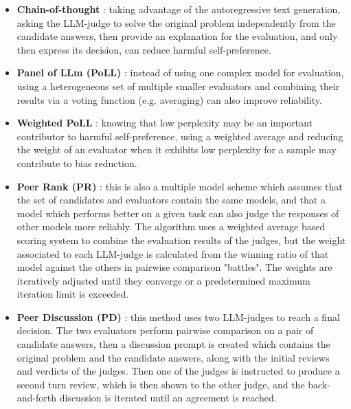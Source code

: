 \documentclass[noindent,nohyp,parspace,titlepage,twoside,12pt]{article}
\begin{document}
        \begin{itemize}
          \item \textbf{Chain-of-thought} \cite{arena,justice}: taking
                advantage of the autoregressive text generation, asking the
                LLM-judge to solve the original problem independently from the
                candidate answers, then provide an explanation for the
                evaluation, and only then express its decision, can reduce
                harmful self-preference.

          \item \textbf{Panel of LLm (PoLL)} \cite{juries}: instead of using
                one complex model for evaluation, using a heterogeneous set of
                multiple smaller evaluators and combining their results via a
                voting function (e.g. averaging) can also improve reliability.

          \item \textbf{Weighted PoLL} \cite{biasself}: knowing that low
                perplexity may be an important contributor to harmful
                self-preference, using a weighted average and reducing the
                weight of an evaluator when it exhibits low perplexity for a
                sample may contribute to bias reduction.

          \item \textbf{Peer Rank (PR)} \cite{prd}: this is also a multiple
                model scheme which assumes that the set of candidates and
                evaluators contain the same models, and that a model which
                performs better on a given task can also judge the responses of
                other models more reliably. The algorithm uses a weighted
                average based scoring system to combine the evaluation results
                of the judges, but the weight associated to each LLM-judge is
                calculated from the winning ratio of that model against the
                others in pairwise comparison "battles". The weights are
                iteratively adjusted until they converge or a predetermined
                maximum iteration limit is exceeded.

          \item \textbf{Peer Discussion (PD)} \cite{prd}: this method uses two
                LLM-judges to reach a final decision. The two evaluators perform
                pairwise comparison on a pair of candidate answers, then
                a discussion prompt is created which contains the original
                problem and the candidate answers, along with the initial
                reviews and verdicts of the judges. Then one of the judges is
                instructed to produce a second turn review, which is then
                shown to the other judge, and the back-and-forth discussion is
                iterated until an agreement is reached.
        \end{itemize}
\end{document}
